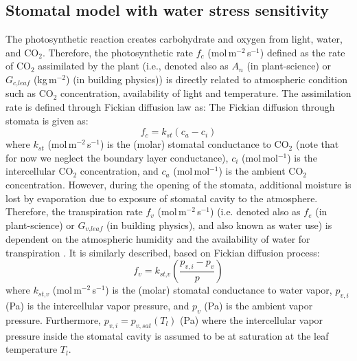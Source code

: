 \subsection{Stomatal model with water stress sensitivity}
\label{subsec:sm}
	
The photosynthetic reaction creates carbohydrate and oxygen from light, water, and CO$_2$. Therefore, the photosynthetic rate $f_c$ (mol\,m$^{-2}$\,s$^{-1}$) defined as the rate of CO$_2$ assimilated by the plant (i.e., denoted also as $A_n$ (in plant-science) or $G_{\textit{c,leaf}}$ (kg\,m$^{-2}$) (in building physics)) is directly related to atmospheric condition such as CO$_2$ concentration, availability of light and temperature. The assimilation rate is defined through Fickian diffusion law as:
The Fickian diffusion through stomata is given as:
\begin{equation}
f_c = k_{\textit{st}} \left(c_a - c_i\right)
\label{eq:fickassim}
\end{equation}
where $k_{st}$ (mol\,m$^{-2}$\,s$^{-1}$) is the (molar) stomatal conductance to CO$_2$ (note that for now we neglect the boundary layer conductance), $c_i$ (mol\,mol$^{-1}$) is the intercellular CO$_2$ concentration, and $c_a$ (mol\,mol$^{-1}$) is the ambient CO$_2$ concentration. However, during the opening of the stomata, additional moisture is lost by evaporation due to exposure of stomatal cavity to the atmosphere. Therefore, the transpiration rate $f_v$ (mol\,m$^{-2}$\,s$^{-1}$) (i.e. denoted also as $f_e$ (in plant-science) or $G_{\textit{v,leaf}}$ (in building physics), and also known as water use) is dependent on the atmospheric humidity and the availability of water for transpiration \citep{Ball1987,Leuning1995}. It is similarly described, based on Fickian diffusion process:
\begin{equation}
f_v = k_{\textit{st,v}} \left(\frac{p_{v,i} - p_v}{p}\right)
\label{eq:fv}
\end{equation}
where $k_{\textit{st,v}}$ (mol\,m$^{-2}$\,s$^{-1}$) is the (molar) stomatal conductance to water vapor, $p_{v,i}$ (Pa) is the intercellular vapor pressure, and $p_v$ (Pa) is the ambient vapor pressure. Furthermore, $p_{v,i} = p_{v,sat}\left(T_l\right)$ (Pa) where the intercellular vapor pressure inside the stomatal cavity is assumed to be at saturation at the leaf temperature $T_l$. 


